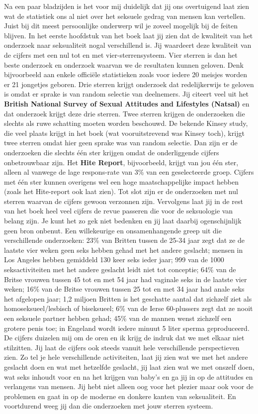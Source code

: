 \documentclass[]{book}
\begin{document}
Na een paar bladzijden is het voor mij duidelijk dat jij ons overtuigend
laat zien wat de statistiek ons al niet over het seksuele gedrag van
mensen kan vertellen. Juist bij dit meest persoonlijke onderwerp wil je
zoveel mogelijk bij de feiten blijven. In het eerste hoofdstuk van het
boek laat jij zien dat de kwaliteit van het onderzoek naar seksualiteit
nogal verschillend is. Jij waardeert deze kwaliteit van de cijfers met
een nul tot en met vier-sterrensysteem. Vier sterren is dan het beste
onderzoek en onderzoek waarvan we de resultaten kunnen geloven. Denk
bijvoorbeeld aan enkele officiële statistieken zoals voor iedere 20
meisjes worden er 21 jongetjes geboren. Drie sterren krijgt onderzoek
dat redelijkerwijs te geloven is omdat er sprake is van random selectie
van deelnemers. Jij citeert veel uit het \textbf{British National Survey
of Sexual Attitudes and Lifestyles (Natsal)} en dat onderzoek krijgt
deze drie sterren. Twee sterren krijgen de onderzoeken die slechts als
ruwe schatting moeten worden beschouwd. De bekende Kinsey study, die
veel plaats krijgt in het boek (wat vooruitstrevend was Kinsey toch),
krijgt twee sterren omdat hier geen sprake was van random selectie. Dan
zijn er de onderzoeken die slechts één ster krijgen omdat de
onderliggende cijfers onbetrouwbaar zijn. Het \textbf{Hite Report},
bijvoorbeeld, krijgt van jou één ster, alleen al vanwege de lage
respons-rate van 3\% van een geselecteerde groep. Cijfers met één ster
kunnen overigens wel een hoge maatschappelijke impact hebben (zoals het
Hite-report ook laat zien). Tot slot zijn er de onderzoeken met nul
sterren waarvan de cijfers gewoon verzonnen zijn. Vervolgens laat jij in
de rest van het boek heel veel cijfers de revue passeren die voor de
seksuologie van belang zijn. Je kunt het zo gek niet bedenken en jij
laat daarbij ogenschijnlijk geen bron onbenut. Een willekeurige en
onsamenhangende greep uit die verschillende onderzoeken: 23\% van
Britten tussen de 25-34 jaar zegt dat ze de laatste vier weken geen seks
hebben gehad met het andere geslacht; mensen in Los Angeles hebben
gemiddeld 130 keer seks ieder jaar; 999 van de 1000 seksactiviteiten met
het andere geslacht leidt niet tot conceptie; 64\% van de Britse vrouwen
tussen 45 tot en met 54 jaar had vaginale seks in de laatste vier weken;
16\% van de Britse vrouwen tussen 25 tot en met 34 jaar had anale seks
het afgelopen jaar; 1,2 miljoen Britten is het geschatte aantal dat
zichzelf ziet als homoseksueel/lesbisch of biseksueel; 6\% van de Ierse
60-plussers zegt dat ze nooit een seksuele partner hebben gehad; 45\%
van de mannen wenst zichzelf een grotere penis toe; in Engeland wordt
iedere minuut 5 liter sperma geproduceerd. De cijfers duizelen mij om de
oren en ik krijg de indruk dat we met elkaar niet stilzitten. Jij laat
de cijfers ook steeds vanuit hele verschillende perspectieven zien. Zo
tel je hele verschillende activiteiten, laat jij zien wat we met het
andere geslacht doen en wat met hetzelfde geslacht, jij laat zien wat we
met onszelf doen, wat seks inhoudt voor en na het krijgen van baby's en
ga jij in op de attitudes en verlangens van mensen. Jij hebt niet alleen
oog voor het plezier maar ook voor de problemen en gaat in op de moderne
en donkere kanten van seksualiteit. En voortdurend weeg jij dan die
onderzoeken met jouw sterren systeem.
\end{document}
